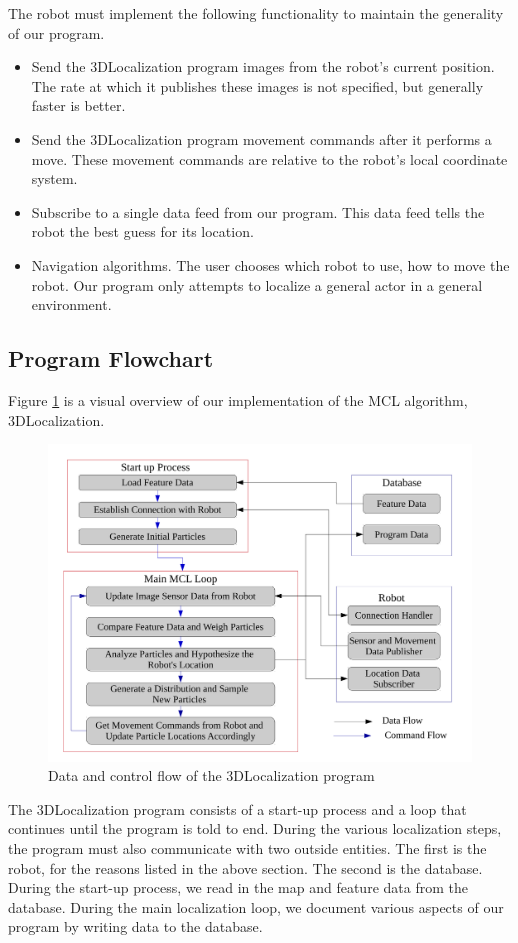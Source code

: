 \documentclass[a4paper,11pt]{article}
\begin{document}
The robot must implement the following functionality to maintain the generality of our program.
  \begin{itemize}
  \item Send the 3DLocalization program images from the robot's current position. The rate at which it publishes these images is not specified, but generally faster is better. 
  \item Send the 3DLocalization program movement commands after it performs a move. These movement commands are relative to the robot's local coordinate system.
  \item Subscribe to a single data feed from our program. This data feed tells the robot the best guess for its location.
  \item Navigation algorithms. The user chooses which robot to use, how to move the robot. Our program only attempts to localize a general actor in a general environment.
  \end{itemize} 


 \subsection{Program Flowchart}
  Figure \ref{fig:flowchart} is a visual overview of our implementation of the MCL algorithm, 3DLocalization.
  \begin{figure}[h!]
   \centering
     \includegraphics[width=\textwidth]{../Artifacts/FlowChart}
 \caption{Data and control flow of the 3DLocalization program}
 \label{fig:flowchart}
\end{figure}

The 3DLocalization program consists of a start-up process and a loop that continues until the program is told to end. During the various localization steps, the program must also communicate with two outside entities. The first is the robot, for the reasons listed in the above section. The second is the database. During the start-up process, we read in the map and feature data from the database. During the main localization loop, we document various aspects of our program by writing data to the database. 
\end{document}
